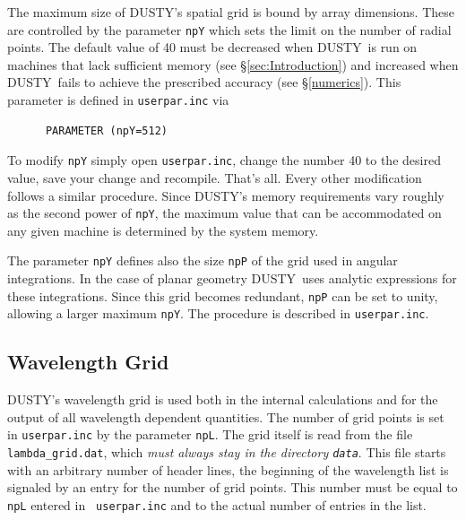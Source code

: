 \documentclass[11pt]{article}
\def\D    {{\sf DUSTY}}
\begin{document}
The maximum size of \D's spatial grid is bound by array
dimensions. These are controlled by the parameter {\tt npY} which sets
the limit on the number of radial points.  The default value of 40
must be decreased when \D\ is run on machines that lack sufficient
memory (see \S\ref{sec:Introduction}) and increased when \D\ fails to
achieve the prescribed accuracy (see \S\ref{numerics}). This parameter
is defined in {\tt userpar.inc} via
\begin{verbatim}
      PARAMETER (npY=512)
\end{verbatim}
To modify {\tt npY} simply open {\tt userpar.inc}, change the number
40 to the desired value, save your change and recompile.  That's all.
Every other modification follows a similar procedure. Since \D's
memory requirements vary roughly as the second power of {\tt npY}, the
maximum value that can be accommodated on any given machine is
determined by the system memory.

The parameter {\tt npY} defines also the size {\tt npP} of the grid
used in angular integrations.  In the case of planar geometry \D\ uses
analytic expressions for these integrations.  Since this grid becomes
redundant, {\tt npP} can be set to unity, allowing a larger maximum
{\tt npY}.  The procedure is described in {\tt userpar.inc}.

\subsection{Wavelength Grid} \label{F-Grid}

\D's wavelength grid is used both in the internal calculations and for the
output of all wavelength dependent quantities. The number of grid points is
set in {\tt userpar.inc} by the parameter {\tt npL}. The grid itself is read
from the file {\tt lambda\_grid.dat}, which \emph{must always stay in the
directory {\tt data}}.  This file starts with an arbitrary number of header
lines, the beginning of the wavelength list is signaled by an entry for the
number of grid points. This number must be equal to {\tt npL} entered in {\tt
userpar.inc} and to the actual number of entries in the list.
\end{document}
